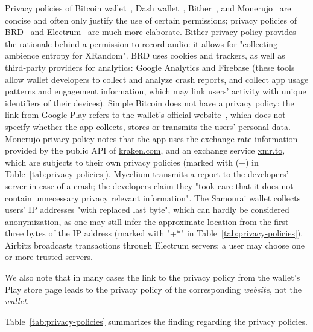 Privacy policies of Bitcoin wallet~\cite{BitcoinWalletPrivacyPolicy}, Dash wallet~\cite{DashWalletPrivacyPolicy}, Bither~\cite{BitherWalletPrivacyPolicy}, and Monerujo~\cite{MonerujoPrivacyPolicy} are concise and often only justify the use of certain permissions; privacy policies of BRD~\cite{BRDPrivacyPolicy} and Electrum~\cite{ElectrumPrivacyPolicy} are much more elaborate.
Bither privacy policy provides the rationale behind a permission to record audio: it allows for "collecting ambience entropy for XRandom".
BRD uses cookies and trackers, as well as third-party providers for analytics: Google Analytics and Firebase (these tools allow wallet developers to collect and analyze crash reports, and collect app usage patterns and engagement information, which may link users' activity with unique identifiers of their devices).
Simple Bitcoin does not have a privacy policy: the link from Google Play refers to the wallet's official website~\cite{SimpleBitcoin}, which does not specify whether the app collects, stores or transmits the users' personal data.
Monerujo privacy policy notes that the app uses the exchange rate information provided by the public API of \url{kraken.com}, and an exchange service \url{xmr.to}, which are subjects to their own privacy policies (marked with (+) in Table~\ref{tab:privacy-policies}).
Mycelium transmits a report to the developers' server in case of a crash; the developers claim they "took care that it does not contain unnecessary privacy relevant information".
The Samourai wallet collects users' IP addresses "with replaced last byte", which can hardly be considered anonymization, as one may still infer the approximate location from the first three bytes of the IP address (marked with "+*" in Table~\ref{tab:privacy-policies}).
Airbitz broadcasts transactions through Electrum servers; a user may choose one or more trusted servers.

We also note that in many cases the link to the privacy policy from the wallet's Play store page leads to the privacy policy of the corresponding \textit{website}, not the \textit{wallet}.

Table~\ref{tab:privacy-policies} summarizes the finding regarding the privacy policies.

